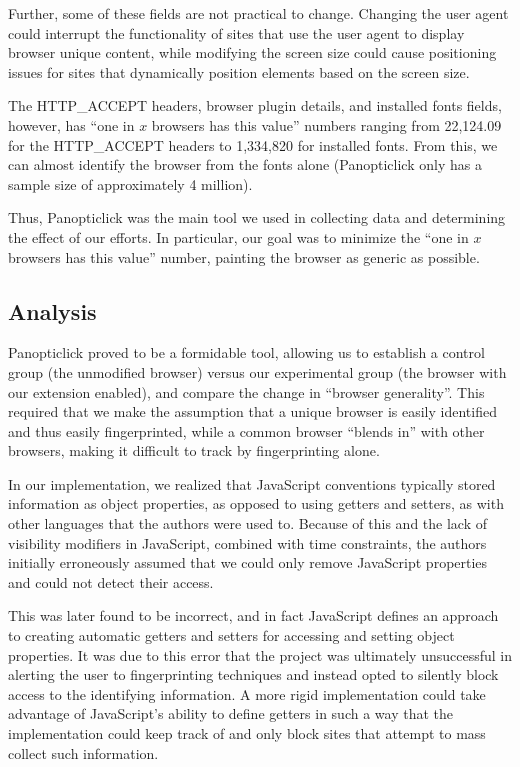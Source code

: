 \documentclass[12pt,a4paper]{article}
\begin{document}
Further, some of these fields are not practical to change. Changing the user agent could interrupt the functionality of sites that use the user agent to display browser unique content, while modifying the screen size could cause positioning issues for sites that dynamically position elements based on the screen size.

The HTTP\_ACCEPT headers, browser plugin details, and installed fonts fields, however, has ``one in $x$ browsers has this value'' numbers ranging from 22,124.09 for the HTTP\_ACCEPT headers to 1,334,820 for installed fonts. From this, we can almost identify the browser from the fonts alone (Panopticlick only has a sample size of approximately 4 million).

Thus, Panopticlick was the main tool we used in collecting data and determining the effect of our efforts. In particular, our goal was to minimize the ``one in $x$ browsers has this value'' number, painting the browser as generic as possible.

\subsection{Analysis}
Panopticlick proved to be a formidable tool, allowing us to establish a control group (the unmodified browser) versus our experimental group (the browser with our extension enabled), and compare the change in ``browser generality''. This required that we make the assumption that a unique browser is easily identified and thus easily fingerprinted, while a common browser ``blends in'' with other browsers, making it difficult to track by fingerprinting alone.

In our implementation, we realized that JavaScript conventions typically stored information as object properties, as opposed to using getters and setters, as with other languages that the authors were used to. Because of this and the lack of visibility modifiers in JavaScript, combined with time constraints, the authors initially erroneously assumed that we could only remove JavaScript properties and could not detect their access.

This was later found to be incorrect, and in fact JavaScript defines an approach to creating automatic getters and setters for accessing and setting object properties. It was due to this error that the project was ultimately unsuccessful in alerting the user to fingerprinting techniques and instead opted to silently block access to the identifying information. A more rigid implementation could take advantage of JavaScript's ability to define getters in such a way that the implementation could keep track of and only block sites that attempt to mass collect such information.
\end{document}

